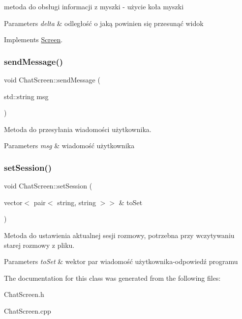 metoda do obsługi informacji z myszki -\/ użycie koła myszki 


\begin{DoxyParams}{Parameters}
{\em delta} & odległość o jaką powinien się przesunąć widok \\
\hline
\end{DoxyParams}


Implements \mbox{\hyperlink{class_screen_a039b9d63b0afafff7af22c26e2d81f5e}{Screen}}.

\mbox{\label{class_chat_screen_abb49aa4421d806044c1778be260fb076}} 
\subsubsection{\texorpdfstring{sendMessage()}{sendMessage()}}
{\footnotesize\ttfamily void Chat\+Screen\+::send\+Message (\begin{DoxyParamCaption}\item[{std\+::string}]{msg }\end{DoxyParamCaption})}



Metoda do przesyłania wiadomości użytkownika. 


\begin{DoxyParams}{Parameters}
{\em msg} & wiadomość użytkownika \\
\hline
\end{DoxyParams}
\mbox{\label{class_chat_screen_a331fe5da06bc56d1256d4135cd0be324}} 
\subsubsection{\texorpdfstring{setSession()}{setSession()}}
{\footnotesize\ttfamily void Chat\+Screen\+::set\+Session (\begin{DoxyParamCaption}\item[{vector$<$ pair$<$ string, string $>$$>$ \&}]{to\+Set }\end{DoxyParamCaption})}



Metoda do ustawienia aktualnej sesji rozmowy, potrzebna przy wczytywaniu starej rozmowy z pliku. 


\begin{DoxyParams}{Parameters}
{\em to\+Set} & wektor par wiadomość użytkownika-\/odpowiedź programu \\
\hline
\end{DoxyParams}


The documentation for this class was generated from the following files\+:\begin{DoxyCompactItemize}
\item 
Chat\+Screen.\+h\item 
Chat\+Screen.\+cpp\end{DoxyCompactItemize}
